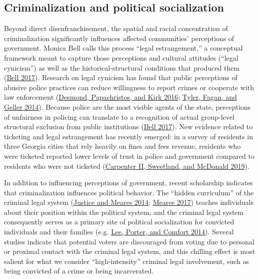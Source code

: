 \documentclass[
  12pt,
]{article}
\begin{document}
\hypertarget{criminalization-and-political-socialization}{%
\subsection*{Criminalization and political socialization}\label{criminalization-and-political-socialization}}

Beyond direct disenfranchisement, the spatial and racial concentration of criminalization significantly influences affected communities' perceptions of government. Monica Bell calls this process ``legal estrangement,'' a conceptual framework meant to capture those perceptions and cultural attitudes (``legal cynicism'') as well as the historical-structural conditions that produced them (\protect\hyperlink{ref-Bell2017}{Bell 2017}). Research on legal cynicism has found that public perceptions of abusive police practices can reduce willingness to report crimes or cooperate with law enforcement (\protect\hyperlink{ref-Desmond2016}{Desmond, Papachristos, and Kirk 2016}; \protect\hyperlink{ref-Tyler2014}{Tyler, Fagan, and Geller 2014}). Because police are the most visible agents of the state, perceptions of unfairness in policing can translate to a recognition of actual group-level structural exclusion from public institutions (\protect\hyperlink{ref-Bell2017}{Bell 2017}). New evidence related to ticketing and legal estrangement has recently emerged: in a survey of residents in three Georgia cities that rely heavily on fines and fees revenue, residents who were ticketed reported lower levels of trust in police and government compared to residents who were not ticketed (\protect\hyperlink{ref-CarpenterII2019}{Carpenter II, Sweetland, and McDonald 2019}).

In addition to influencing perceptions of government, recent scholarship indicates that criminalization influences political behavior. The ``hidden curriculum'' of the criminal legal system (\protect\hyperlink{ref-Justice2014}{Justice and Meares 2014}; \protect\hyperlink{ref-Meares2017}{Meares 2017}) teaches individuals about their position within the political system, and the criminal legal system consequently serves as a primary site of political socialization for convicted individuals and their families (e.g. \protect\hyperlink{ref-Lee2014}{Lee, Porter, and Comfort 2014}). Several studies indicate that potential voters are discouraged from voting due to personal or proximal contact with the criminal legal system, and this chilling effect is most salient for what we consider ``high-intensity'' criminal legal involvement, such as being convicted of a crime or being incarcerated.
\end{document}
